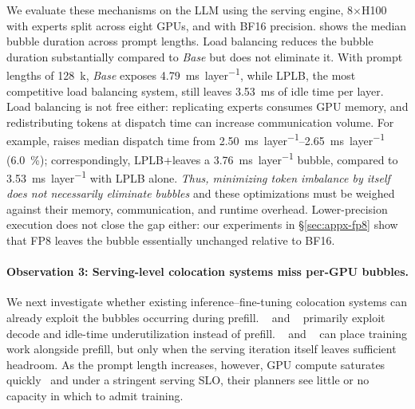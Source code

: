 We evaluate these mechanisms on the \deepseekmoe \ac{LLM} using the \sglang serving engine, 8$\times$H100 with experts split across eight GPUs, and with BF16 precision.
 shows the median bubble duration across prompt lengths.
Load balancing reduces the bubble duration substantially compared to \emph{Base} but does not eliminate it.
With prompt lengths of \SI{128}{k}, \emph{Base} exposes \SI{4.79}{\milli\second\per layer}, while \ac{LPLB}, the most competitive load balancing system, still leaves \SI{3.53}{\milli\second} of idle time per layer.
Load balancing is not free either: replicating experts consumes GPU memory, and redistributing tokens at dispatch time can increase communication volume.
For example, \waterfill raises median dispatch time from \SIrange{2.50}{2.65}{\milli\second\per layer} (\SI{6.0}{\percent}); correspondingly, \ac{LPLB}+\waterfill leaves a \SI{3.76}{\milli\second\per layer} bubble, compared to \SI{3.53}{\milli\second\per layer} with \ac{LPLB} alone.
\emph{Thus, minimizing token imbalance by itself does not necessarily eliminate bubbles} and these optimizations must
be weighed against their memory, communication, and runtime overhead.
Lower-precision execution does not close the gap either: our experiments in \S\ref{sec:appx-fp8} show that FP8 leaves the bubble essentially unchanged relative to BF16.


\paragraph{Observation 3: Serving-level colocation systems miss per-GPU bubbles.}
\label{sec:gap}
We next investigate whether existing inference--fine-tuning colocation systems can already exploit the bubbles occurring during prefill.
\llmstation~\cite{llmstation} and \harli~\cite{harli} primarily exploit decode and idle-time underutilization instead of prefill.
\flexllm~\cite{flexllm} and \deltaserve~\cite{deltaserve} can place training work alongside prefill, but only when the serving iteration itself leaves sufficient headroom.
As the prompt length increases, however, GPU compute saturates quickly~\cite{sarathi} and under a stringent serving \ac{SLO}, their planners see little or no capacity in which to admit training.

